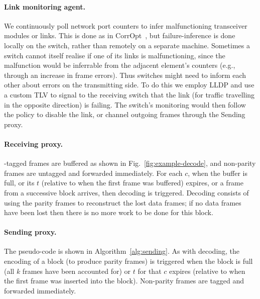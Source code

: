 \paragraph{Link monitoring agent.}
  We continuously poll network port counters to infer malfunctioning transceiver
  modules or links. This is done as in
  CorrOpt~\cite{Zhuo:2017:UMP:3098822.3098849}, but failure-inference is done
  locally on the switch, rather than remotely on a separate machine.
  Sometimes a switch cannot itself realise if one of its links is
  malfunctioning, since the malfunction would be inferrable from the adjacent
  element's counters (e.g., through an increase in frame errors). Thus switches
  might need to inform each other about errors on the transmitting side. To do
  this we employ LLDP and use a custom TLV to signal to the receiving switch
  that the link (for traffic travelling in the opposite direction) is failing.
  The switch's monitoring would then follow the policy to disable the link, or
  channel outgoing frames through the Sending proxy.


\paragraph{Receiving proxy.}
\OurSys-tagged frames are buffered as shown in Fig.~\ref{fig:example-decode},
and non-parity frames are untagged and forwarded immediately.
For each $c$, when the buffer is full, or its $t$ (relative to when the first
frame was buffered) expires, or a frame from a successive block arrives, then
decoding is triggered. Decoding consists of using the parity frames to
reconstruct the lost data frames; if no data frames have been lost then there
is no more work to be done for this block.

\paragraph{Sending proxy.}
The pseudo-code is shown in Algorithm~\ref{alg:sending}.
As with decoding, the encoding of a block (to produce parity frames) is
triggered when the block is full (all $k$ frames have been accounted for) or
$t$ for that $c$ expires (relative to when the first frame was inserted into
the block). Non-parity frames are tagged and forwarded immediately.

